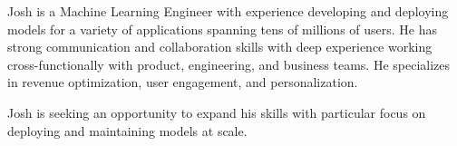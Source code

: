 

\begin{cvparagraph}

Josh is a Machine Learning Engineer with experience developing and deploying models for a variety of applications spanning tens of millions of users. 
He has strong communication and collaboration skills with deep experience working cross-functionally with product, engineering, and business teams. 
He specializes in revenue optimization, user engagement, and personalization.

Josh is seeking an opportunity to expand his skills with particular focus on deploying and maintaining models at scale.

\end{cvparagraph}

